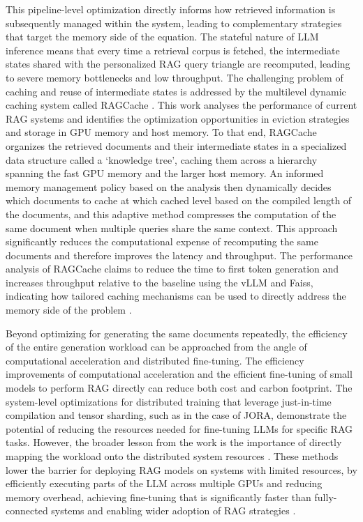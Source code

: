 \documentclass[11pt]{article}
\begin{document}
This pipeline-level optimization directly informs how retrieved information is subsequently managed within the system, leading to complementary strategies that target the memory side of the equation. The stateful nature of LLM inference means that every time a retrieval corpus is fetched, the intermediate states shared with the personalized RAG query triangle are recomputed, leading to severe memory bottlenecks and low throughput. The challenging problem of caching and reuse of intermediate states is addressed by the multilevel dynamic caching system called RAGCache \cite{ref58}. This work analyses the performance of current RAG systems and identifies the optimization opportunities in eviction strategies and storage in GPU memory and host memory. To that end, RAGCache organizes the retrieved documents and their intermediate states in a specialized data structure called a `knowledge tree', caching them across a hierarchy spanning the fast GPU memory and the larger host memory. An informed memory management policy based on the analysis then dynamically decides which documents to cache at which cached level based on the compiled length of the documents, and this adaptive method compresses the computation of the same document when multiple queries share the same context. This approach significantly reduces the computational expense of recomputing the same documents and therefore improves the latency and throughput. The performance analysis of RAGCache claims to reduce the time to first token generation and increases throughput relative to the baseline using the vLLM and Faiss, indicating how tailored caching mechanisms can be used to directly address the memory side of the problem \cite{ref58,ref59}.

Beyond optimizing for generating the same documents repeatedly, the efficiency of the entire generation workload can be approached from the angle of computational acceleration and distributed fine-tuning. The efficiency improvements of computational acceleration and the efficient fine-tuning of small models to perform RAG directly can reduce both cost and carbon footprint. The system-level optimizations for distributed training that leverage just-in-time compilation and tensor sharding, such as in the case of JORA, demonstrate the potential of reducing the resources needed for fine-tuning LLMs for specific RAG tasks. However, the broader lesson from the work is the importance of directly mapping the workload onto the distributed system resources \cite{ref60}. These methods lower the barrier for deploying RAG models on systems with limited resources, by efficiently executing parts of the LLM across multiple GPUs and reducing memory overhead, achieving fine-tuning that is significantly faster than fully-connected systems and enabling wider adoption of RAG strategies \cite{ref60}.
\end{document}
